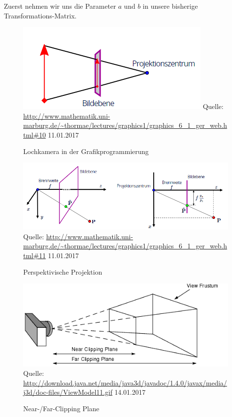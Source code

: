 Zuerst nehmen wir uns die Parameter $a$ und $b$ in unsere bisherige Transformations-Matrix. 

\begin{figure}
	\centering
	\includegraphics[scale=0.7]{02theorie/Lochkamera.png}
	Quelle: \url{http://www.mathematik.uni-marburg.de/~thormae/lectures/graphics1/graphics_6_1_ger_web.html#10}	
	11.01.2017
	\caption{Lochkamera in der Grafikprogrammierung}\label{lochkamera}
\end{figure}

\begin{figure}
	\centering
	\includegraphics[scale=0.7]{02theorie/perspektivischeprojektion.png}
	Quelle: \url{http://www.mathematik.uni-marburg.de/~thormae/lectures/graphics1/graphics_6_1_ger_web.html#11}	
	11.01.2017
	\caption{Perspektivische Projektion}\label{perspproj}
\end{figure}

\begin{figure}
	\centering
	\includegraphics[scale=0.7]{02theorie/ViewModel11.png}
	Quelle: \url{http://download.java.net/media/java3d/javadoc/1.4.0/javax/media/j3d/doc-files/ViewModel11.gif}	
	14.01.2017
	\caption{Near-/Far-Clipping Plane}\label{nfplane}
\end{figure}
